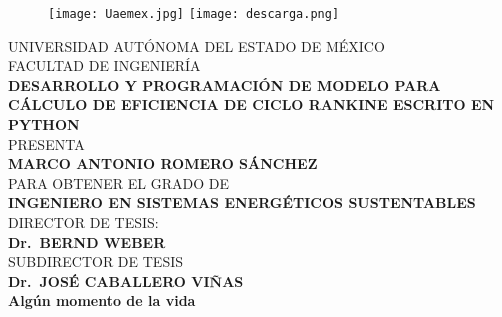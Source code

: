 \begin{figure}[tbp]
    \texttt{[image: Uaemex.jpg]}\hspace*{9.2cm}
    \texttt{[image: descarga.png]} 
\end{figure}
\begin{center}
    UNIVERSIDAD AUTÓNOMA DEL ESTADO DE MÉXICO \\
    FACULTAD DE INGENIERÍA \\ \vspace{1.4cm}
    \textbf{DESARROLLO Y PROGRAMACIÓN DE MODELO PARA CÁLCULO DE EFICIENCIA DE CICLO RANKINE ESCRITO EN PYTHON}  \\ \vspace{1.4cm}
    PRESENTA \\
    \textbf{MARCO ANTONIO ROMERO SÁNCHEZ \\}
    PARA OBTENER EL GRADO DE \\
    \textbf{INGENIERO EN SISTEMAS ENERGÉTICOS SUSTENTABLES \\}
    DIRECTOR DE TESIS:\\
    \textbf{Dr.\ BERND WEBER \\}
    SUBDIRECTOR DE TESIS\@ \\
    \textbf{Dr.\ JOSÉ CABALLERO VIÑAS \\}
    \vspace{2cm}
    \raggedleft{}
        \textbf{Algún momento de la vida \\}
\end{center}



